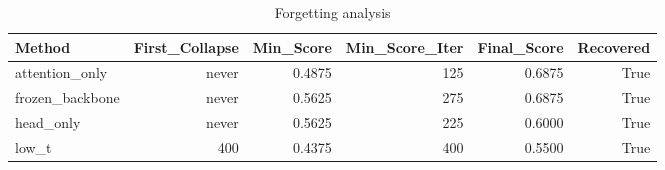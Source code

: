 \begin{table}[htbp]
\centering
\caption{Forgetting analysis}
\label{tab:forgetting}
\begin{tabular}{lrrrrr}
\toprule
\textbf{Method} & \textbf{First\_Collapse} & \textbf{Min\_Score} & \textbf{Min\_Score\_Iter} & \textbf{Final\_Score} & \textbf{Recovered} \\
\midrule
attention\_only & never & 0.4875 & 125 & 0.6875 & True \\
frozen\_backbone & never & 0.5625 & 275 & 0.6875 & True \\
head\_only & never & 0.5625 & 225 & 0.6000 & True \\
low\_t & 400 & 0.4375 & 400 & 0.5500 & True \\
\bottomrule
\end{tabular}
\end{table}